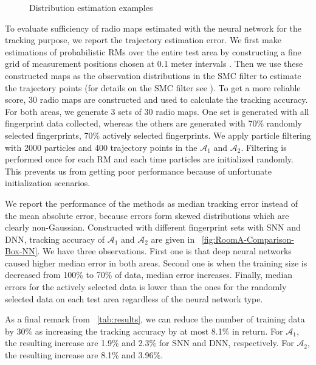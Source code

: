 \documentclass[conference]{IEEEtran}
\begin{document}
{\begin{figure}[h]
		\caption{Distribution estimation examples}
		\label{fig:predictions}
	\end{figure} 
	
	
	To evaluate sufficiency of radio maps estimated with the neural network for the tracking purpose, we report the trajectory estimation error. We first make estimations of probabilistic RMs over the entire test area by constructing a fine grid of measurement positions chosen at 0.1 meter intervals \cite{Ser2017}. Then we use these constructed maps as the observation distributions in the SMC filter to estimate the trajectory points (for details on the SMC filter see \cite{Ser2017}). To get a more reliable score, 30 radio maps are constructed and used to calculate the tracking accuracy. For both areas, we generate 3 sets of 30 radio maps. One set is generated with all fingerprint data collected, whereas the others are generated with 70\% randomly selected fingerprints, 70\% actively selected fingerprints. We apply particle filtering with 2000 particles and 400 trajectory points in the $\mathcal{A}_1$ and $\mathcal{A}_2$. Filtering is performed once for each RM and each time particles are initialized randomly. This prevents us from getting poor performance because of unfortunate initialization scenarios.
	
	We report the performance of the methods as median tracking error instead of the mean absolute error, because errors form skewed distributions which are clearly non-Gaussian. Constructed with different fingerprint sets with SNN and DNN, tracking accuracy of $\mathcal{A}_1$ and $\mathcal{A}_2$ are given in \figurename~\ref{fig:RoomA-Comparison-Box-NN}. We have three observations. First one is that deep neural networks caused higher median error in both areas. Second one is when the training size is decreased from 100\% to 70\% of data, median error increases. Finally, median errors for the actively selected data is lower than the ones for the randomly selected data on each test area regardless of the neural network type. 
	
	As a final remark from \tablename~\ref{tab:results}, we can reduce the number of training data by 30\% as increasing the tracking accuracy by at most 8.1\% in return. For $\mathcal{A}_1$, the resulting increase are 1.9\% and 2.3\% for SNN and DNN, respectively. For $\mathcal{A}_2$, the resulting increase are 8.1\% and 3.96\%.
	
}
\end{document}
